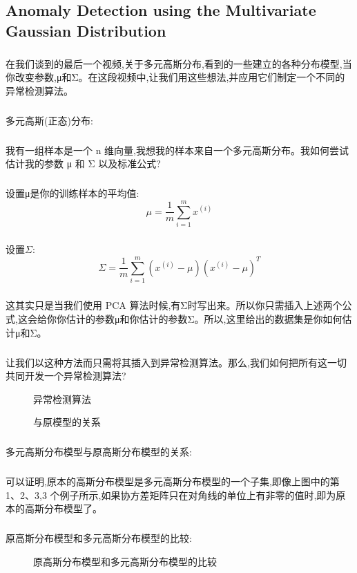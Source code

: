 \documentclass{article}
\begin{document}
\begin{CJK}{UTF8}{gbsn}
\subsection{Anomaly Detection using the Multivariate Gaussian Distribution}
\subparagraph{}
在我们谈到的最后一个视频,关于多元高斯分布,看到的一些建立的各种分布模型,当你改变参数,μ和Σ。在这段视频中,让我们用这些想法,并应用它们制定一个不同的异常检测算法。
\subparagraph{}
多元高斯(正态)分布:
\begin{figure}[H]
\label{fig:972}
\end{figure}
\begin{figure}[H]
\label{fig:973}
\end{figure}
\subparagraph{}
我有一组样本是一个 n 维向量,我想我的样本来自一个多元高斯分布。我如何尝试估计我的参数 μ 和 Σ 以及标准公式?
\subparagraph{}
设置μ是你的训练样本的平均值:
\begin{equation}
\mu=\frac{1}{m}\sum_{i=1}^mx^{(i)}
\end{equation}
\subparagraph{}
设置$\Sigma$:
\begin{equation}
\Sigma=\frac{1}{m}\sum_{i=1}^m(x^{(i)}-\mu){(x^{(i)}-\mu)}^T
\end{equation}
\subparagraph{}
这其实只是当我们使用 PCA 算法时候,有Σ时写出来。所以你只需插入上述两个公式,这会给你你估计的参数μ和你估计的参数Σ。所以,这里给出的数据集是你如何估计μ和Σ。
\subparagraph{}
让我们以这种方法而只需将其插入到异常检测算法。那么,我们如何把所有这一切共同开发一个异常检测算法?
\begin{figure}[H]
\label{fig:974}
\caption{异常检测算法}
\end{figure}
\begin{figure}[H]
\label{fig:975}
\caption{与原模型的关系}
\end{figure}
\subparagraph{}
多元高斯分布模型与原高斯分布模型的关系:
\subparagraph{}
可以证明,原本的高斯分布模型是多元高斯分布模型的一个子集,即像上图中的第1、2、3,3 个例子所示,如果协方差矩阵只在对角线的单位上有非零的值时,即为原本的高斯分布模型了。
\subparagraph{}
原高斯分布模型和多元高斯分布模型的比较:
\begin{figure}[H]
\label{fig:946}
\caption{原高斯分布模型和多元高斯分布模型的比较}
\end{figure}
\begin{figure}[H]

\end{figure}
\end{CJK}
\end{document}
